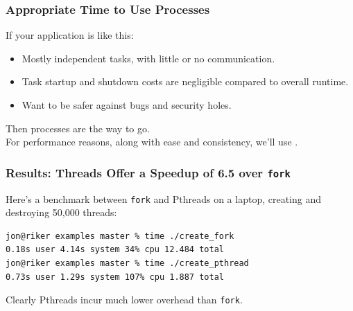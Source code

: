 \begin{frame}[fragile]
  \frametitle{Appropriate Time to Use Processes}

  \begin{changemargin}{1cm}
  If your application is like this:
  \begin{itemize}
    \item Mostly independent tasks, with little or no communication.
    \item Task startup and shutdown costs are negligible compared to overall runtime.
    \item Want to be safer against bugs and security holes.
  \end{itemize}
  Then processes are the way to go. \\[1em]

  For performance reasons, along with ease and consistency, we'll use
  .
  \end{changemargin}

\end{frame}

\begin{frame}[fragile]
  \frametitle{Results: Threads Offer a Speedup of 6.5 over {\tt fork}}

  \begin{changemargin}{1cm}
  Here's a benchmark between {\tt fork} and Pthreads on a laptop, creating and
  destroying 50,000 threads:
  \vfill
  \begin{lstlisting}[basicstyle=\scriptsize]
jon@riker examples master % time ./create_fork 
0.18s user 4.14s system 34% cpu 12.484 total
jon@riker examples master % time ./create_pthread 
0.73s user 1.29s system 107% cpu 1.887 total
  \end{lstlisting}
  \vfill
  Clearly Pthreads incur much lower overhead than {\tt fork}.
  \end{changemargin}
\end{frame}





